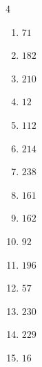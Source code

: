 \begin{multicols}{4}
\begin{enumerate}

  \item $71$


  \item $182$


  \item $210$


  \item $12$


  \item $112$


  \item $214$


  \item $238$


\columnbreak %

  \item $161$


  \item $162$


  \item $92$


  \item $196$


  \item $57$


  \item $230$


  \item $229$


  \item $16$



\end{enumerate}
\end{multicols}
